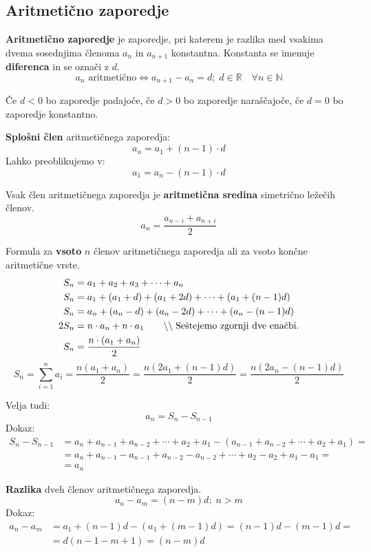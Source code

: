 \documentclass[a4paper,oneside,12pt,fleqn]{article}
\def\R{\ensuremath{\mathbb R}}
\def\N{\ensuremath{\mathbb N}}
\newcommand\krat\cdot
\newcommand{\comment}[1]{\ensuremath{\qquad\backslash\backslash\;}\textnormal{#1}}
\renewcommand\iff\Leftrightarrow
\numberwithin{equation}{section}
\begin{document}
\subsection{Aritmetično zaporedje}
\label{sec:zap:aritm}
\textbf{Aritmetično zaporedje} je zaporedje, pri katerem je razlika med vsakima dvema
sosednjima členoma $a_n$ in $a_{n+1}$ konstantna. Konstanta se imenuje \textbf{diferenca} in se označi z $d$.
\[ a_n \text{ aritmetično} \iff a_{n+1} - a_n = d; \; d \in \R \quad \forall n \in \N \]

Če $d < 0$ bo zaporedje padajoče, če $d > 0$ bo zaporedje naraščajoče, če $d = 0$ bo
zaporedje konstantno.

\textbf{Splošni člen} aritmetičnega zaporedja:
\[ a_n = a_1 + (n-1)\krat d \]
Lahko preoblikujemo v:
\[ a_1 = a_n - (n-1)\krat d \]

Vsak člen aritmetičnega zaporedja je \textbf{aritmetična sredina} simetrično ležečih členov.
\[ a_n = \frac{a_{n-i} + a_{n+i}}{2} \]

Formula za \textbf{vsoto} $n$ členov aritmetičnega zaporedja ali za vsoto končne
aritmetične vrste.
\begin{align*}
  S_n &= a_1 + a_2 + a_3 + \cdots + a_n \\
  S_n &= a_1 + (a_1 + d) + (a_1 + 2d) + \cdots + (a_1 + (n-1)d) \\
  S_n &= a_n + (a_n - d) + (a_n - 2d) + \cdots + (a_n - (n-1)d) \\
  2S_n &= n\krat a_n + n \krat a_1 \comment{Seštejemo zgornji dve enačbi.} \\
  S_n &= \frac{n\krat(a_1 + a_n)}{2}
\end{align*}
\begin{equation}
  S_n = \sum_{i = 1}^n a_i = \frac{n(a_1 + a_n)}{2} = \frac{n(2a_1 + (n-1)d)}{2} =
  \frac{n(2a_n - (n-1)d)}{2} \label{eq:zap:arisum}
\end{equation}

Velja tudi:
\[ a_n = S_n - S_{n-1} \]
Dokaz:
\begin{align*}
  S_n - S_{n-1} &= a_n + a_{n-1} + a_{n-2} + \cdots + a_2 + a_1 - (a_{n-1} + a_{n-2} +
  \cdots + a_2 + a_1) = \\ &= a_n + a_{n-1} - a_{n-1} + a_{n-2} - a_{n-2} + \cdots + a_2 - a_2 +
  a_1 - a_1 = \\ &=  a_n 
\end{align*}

\textbf{Razlika} dveh členov aritmetičnega zaporedja.
\[ a_n - a_m = (n-m)d; \; n > m \]
Dokaz:
\begin{align*}
  a_n - a_m &=  a_1 + (n-1)d - ( a_1 + (m-1)d) = (n-1)d - (m-1)d = \\
  &= d(n-1-m+1) = (n-m)d  
\end{align*}
\end{document}
